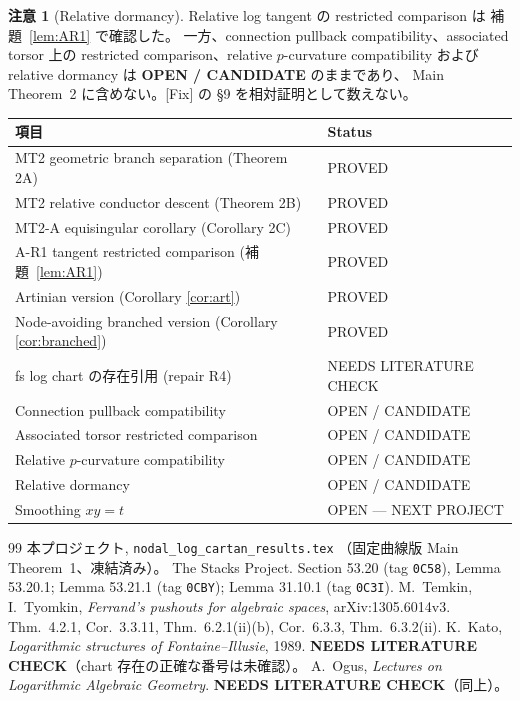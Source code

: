 \documentclass[11pt,a4paper]{article}
\numberwithin{equation}{section}
\theoremstyle{definition}
\newtheorem{remark}[definition]{注意}
\begin{document}
\begin{remark}[Relative dormancy]\label{rem:dormancy}
Relative log tangent の restricted comparison は
補題~\ref{lem:AR1} で確認した。
一方、connection pullback compatibility、associated torsor 上の
restricted comparison、relative \(p\)-curvature compatibility および
relative dormancy は \textbf{OPEN / CANDIDATE} のままであり、
Main Theorem~2 に含めない。[Fix] の \S9 を相対証明として数えない。
\end{remark}

\begin{table}[h]
\centering
\begin{tabular}{@{}ll@{}}
\hline
項目 & Status \\
\hline
MT2 geometric branch separation (Theorem 2A) & PROVED \\
MT2 relative conductor descent (Theorem 2B) & PROVED \\
MT2-A equisingular corollary (Corollary 2C) & PROVED \\
A-R1 tangent restricted comparison (補題~\ref{lem:AR1}) & PROVED \\
Artinian version (Corollary \ref{cor:art}) & PROVED \\
Node-avoiding branched version (Corollary \ref{cor:branched}) & PROVED \\
fs log chart の存在引用 (repair R4) & NEEDS LITERATURE CHECK \\
Connection pullback compatibility & OPEN / CANDIDATE \\
Associated torsor restricted comparison & OPEN / CANDIDATE \\
Relative $p$-curvature compatibility & OPEN / CANDIDATE \\
Relative dormancy & OPEN / CANDIDATE \\
Smoothing $xy=t$ & OPEN --- NEXT PROJECT \\
\hline
\end{tabular}
\end{table}

\begin{thebibliography}{99}
 本プロジェクト, \texttt{nodal\_log\_cartan\_results.tex}
  （固定曲線版 Main Theorem~1、凍結済み）。
 The Stacks Project.
  Section 53.20 (tag \texttt{0C58}), Lemma 53.20.1;
  Lemma 53.21.1 (tag \texttt{0CBY});
  Lemma 31.10.1 (tag \texttt{0C3I}).
 M.~Temkin, I.~Tyomkin, \emph{Ferrand's pushouts for algebraic
  spaces}, arXiv:1305.6014v3. Thm.~4.2.1, Cor.~3.3.11, Thm.~6.2.1(ii)(b),
  Cor.~6.3.3, Thm.~6.3.2(ii).
 K.~Kato, \emph{Logarithmic structures of Fontaine--Illusie},
  1989. \textbf{NEEDS LITERATURE CHECK}（chart 存在の正確な番号は未確認）。
 A.~Ogus, \emph{Lectures on Logarithmic Algebraic Geometry}.
  \textbf{NEEDS LITERATURE CHECK}（同上）。
\end{thebibliography}
\end{document}
